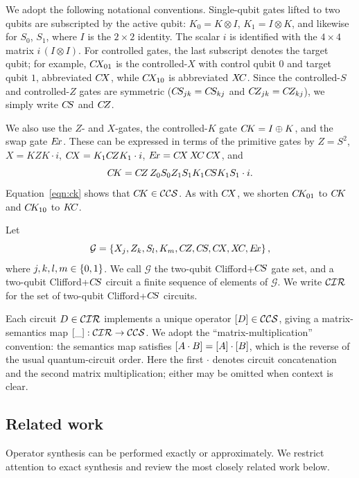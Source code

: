 \documentclass[reprint,amsmath,amssymb,aps,pra]{revtex4-2}
\begin{document}
We adopt the following notational conventions. Single-qubit gates
lifted to two qubits are subscripted by the active qubit:
$K_0 = K \otimes I$, $K_1 = I \otimes K$, and likewise for $S_0$,
$S_1$, where $I$ is the $2 \times 2$ identity. The scalar $i$ is
identified with the $4\times 4$ matrix $i\,(I\otimes I)$. For
controlled gates, the last subscript denotes the target qubit; for
example, $C\kern-.16667em X_{01}$ is the controlled-$X$ with control qubit $0$ and
target qubit $1$, abbreviated $C\kern-.16667em X$, while $C\kern-.16667em X_{10}$ is abbreviated
$X\kern-.16667em C$. Since the controlled-$S$ and controlled-$Z$ gates are symmetric
($C\kern-.16667em S_{jk}=C\kern-.16667em S_{kj}$ and $C\kern-.16667em Z_{jk}=C\kern-.16667em Z_{kj}$), we simply write $C\kern-.16667em S$
and $C\kern-.16667em Z$.

We also use the $Z$- and $X$-gates, the controlled-$K$ gate
$C\kern-.16667em K = I \oplus K$, and the swap gate $E\kern-.16667em x$. These can be expressed in
terms of the primitive gates by $Z = S^2$, $X = KZK \cdot i$,
$C\kern-.16667em X = K_1C\kern-.16667em Z K_1\cdot i$, $E\kern-.16667em x = C\kern-.16667em X \, X\kern-.16667em C \, C\kern-.16667em X$, and
\begin{equation}
  \label{eqn:ck}
  C\kern-.16667em K = C\kern-.16667em Z \, Z_0S_0Z_1S_1K_1C\kern-.16667em S K_1S_1\cdot i.
\end{equation}
Equation~\eqref{eqn:ck} shows that $C\kern-.16667em K \in {\mathcal{CCS}}$. As with
$C\kern-.16667em X$, we shorten $C\kern-.16667em K_{01}$ to $C\kern-.16667em K$ and $C\kern-.16667em K_{10}$ to $K\kern-.16667em C$.

\begin{definition}
  \label{def:cir}
  Let
  \[
    \mathcal G =
    \left\{X_j,Z_k,S_l,K_m,C\kern-.16667em Z,C\kern-.16667em S,C\kern-.16667em X,X\kern-.16667em C,E\kern-.16667em x\right\},
  \]
  where $j,k,l,m \in \left\{0,1\right\}$. We call $\mathcal G$ the two-qubit
  Clifford+$C\kern-.16667em S$ gate set, and a two-qubit Clifford+$C\kern-.16667em S$ circuit a
  finite sequence of elements of $\mathcal G$. We write ${\mathcal{CIR}}$ for
  the set of two-qubit Clifford+$C\kern-.16667em S$ circuits.
\end{definition}

Each circuit $D \in {\mathcal{CIR}}$ implements a unique operator
$[D] \in {\mathcal{CCS}}$, giving a matrix-semantics map
$[\_] : {\mathcal{CIR}} \to {\mathcal{CCS}}$. We adopt the
``matrix-multiplication'' convention: the semantics map satisfies
$[A \cdot B] = [A] \cdot [B]$, which is the reverse of the
usual quantum-circuit order. Here the first $\cdot$ denotes circuit
concatenation and the second matrix multiplication; either may be
omitted when context is clear.

\subsection{Related work}

Operator synthesis can be performed exactly or approximately. We
restrict attention to exact synthesis and review the most closely
related work below.
\end{document}
